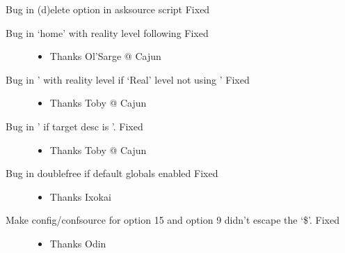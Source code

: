 \documentclass[letterpaper,10pt,english]{sphinxmanual}
\begin{document}
\sphinxAtStartPar
Bug in (d)elete option in asksource script \sphinxhyphen{} Fixed
\begin{description}
\item[{Bug in ‘home’ with reality level following \sphinxhyphen{} Fixed}] \leavevmode\begin{itemize}
\item {} 
\sphinxAtStartPar
Thanks Ol’Sarge @ Cajun

\end{itemize}

\item[{Bug in ’ with reality level if ‘Real’ level not using ’ \sphinxhyphen{} Fixed}] \leavevmode\begin{itemize}
\item {} 
\sphinxAtStartPar
Thanks Toby @ Cajun

\end{itemize}

\item[{Bug in ’ if target desc is ’. \sphinxhyphen{} Fixed}] \leavevmode\begin{itemize}
\item {} 
\sphinxAtStartPar
Thanks Toby @ Cajun

\end{itemize}

\item[{Bug in double\sphinxhyphen{}free if default globals enabled \sphinxhyphen{} Fixed}] \leavevmode\begin{itemize}
\item {} 
\sphinxAtStartPar
Thanks Ixokai

\end{itemize}

\item[{Make config/confsource for option 15 and option 9 didn’t escape the ‘\$’. \sphinxhyphen{} Fixed}] \leavevmode\begin{itemize}
\item {} 
\sphinxAtStartPar
Thanks Odin

\end{itemize}

\end{description}
\end{document}
